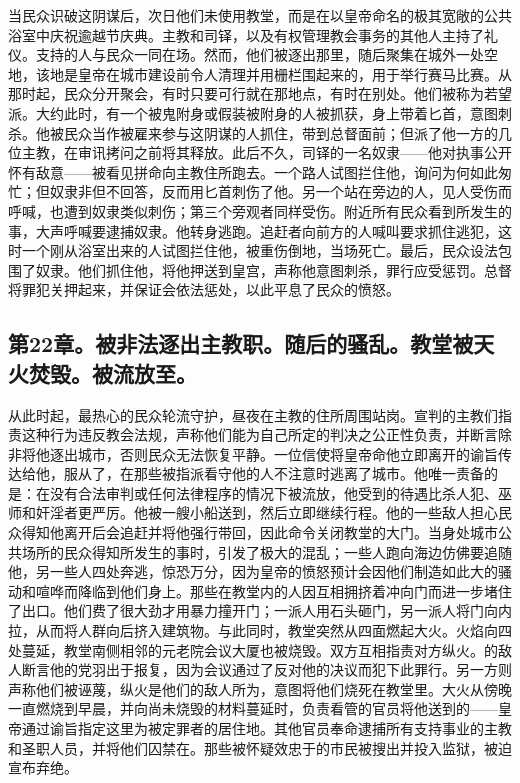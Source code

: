 当民众识破这阴谋后，次日他们未使用教堂，而是在以皇帝命名的极其宽敞的公共浴室中庆祝逾越节庆典。主教和司铎，以及有权管理教会事务的其他人主持了礼仪。支持的人与民众一同在场。然而，他们被逐出那里，随后聚集在城外一处空地，该地是皇帝在城市建设前令人清理并用栅栏围起来的，用于举行赛马比赛。从那时起，民众分开聚会，有时只要可行就在那地点，有时在别处。他们被称为若望派。大约此时，有一个被鬼附身或假装被附身的人被抓获，身上带着匕首，意图刺杀。他被民众当作被雇来参与这阴谋的人抓住，带到总督面前；但派了他一方的几位主教，在审讯拷问之前将其释放。此后不久，司铎的一名奴隶——他对执事公开怀有敌意——被看见拼命向主教住所跑去。一个路人试图拦住他，询问为何如此匆忙；但奴隶非但不回答，反而用匕首刺伤了他。另一个站在旁边的人，见人受伤而呼喊，也遭到奴隶类似刺伤；第三个旁观者同样受伤。附近所有民众看到所发生的事，大声呼喊要逮捕奴隶。他转身逃跑。追赶者向前方的人喊叫要求抓住逃犯，这时一个刚从浴室出来的人试图拦住他，被重伤倒地，当场死亡。最后，民众设法包围了奴隶。他们抓住他，将他押送到皇宫，声称他意图刺杀，罪行应受惩罚。总督将罪犯关押起来，并保证会依法惩处，以此平息了民众的愤怒。\par


\subsection{第22章。被非法逐出主教职。随后的骚乱。教堂被天火焚毁。被流放至。}

从此时起，最热心的民众轮流守护，昼夜在主教的住所周围站岗。宣判的主教们指责这种行为违反教会法规，声称他们能为自己所定的判决之公正性负责，并断言除非将他逐出城市，否则民众无法恢复平静。一位信使将皇帝命他立即离开的谕旨传达给他，服从了，在那些被指派看守他的人不注意时逃离了城市。他唯一责备的是：在没有合法审判或任何法律程序的情况下被流放，他受到的待遇比杀人犯、巫师和奸淫者更严厉。他被一艘小船送到，然后立即继续行程。他的一些敌人担心民众得知他离开后会追赶并将他强行带回，因此命令关闭教堂的大门。当身处城市公共场所的民众得知所发生的事时，引发了极大的混乱；一些人跑向海边仿佛要追随他，另一些人四处奔逃，惊恐万分，因为皇帝的愤怒预计会因他们制造如此大的骚动和喧哗而降临到他们身上。那些在教堂内的人因互相拥挤着冲向门而进一步堵住了出口。他们费了很大劲才用暴力撞开门；一派人用石头砸门，另一派人将门向内拉，从而将人群向后挤入建筑物。与此同时，教堂突然从四面燃起大火。火焰向四处蔓延，教堂南侧相邻的元老院会议大厦也被烧毁。双方互相指责对方纵火。的敌人断言他的党羽出于报复，因为会议通过了反对他的决议而犯下此罪行。另一方则声称他们被诬蔑，纵火是他们的敌人所为，意图将他们烧死在教堂里。大火从傍晚一直燃烧到早晨，并向尚未烧毁的材料蔓延时，负责看管的官员将他送到的——皇帝通过谕旨指定这里为被定罪者的居住地。其他官员奉命逮捕所有支持事业的主教和圣职人员，并将他们囚禁在。那些被怀疑效忠于的市民被搜出并投入监狱，被迫宣布弃绝。\par


